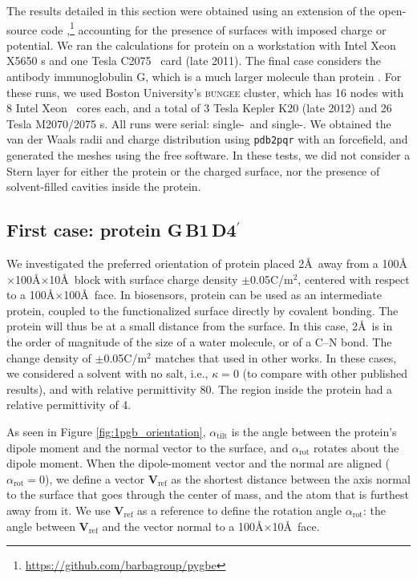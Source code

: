 
The results detailed in this section were obtained using an extension of the open-source code \pygbe,\footnote{\href{https://github.com/barbagroup/pygbe}{https://github.com/barbagroup/pygbe}} accounting for the presence of surfaces with imposed charge or potential.\cite{CooperBarba2015a}
We ran the calculations for protein \gb on a workstation with Intel Xeon X5650 \cpu s  and one \nvidia Tesla C2075 \gpu\ card (late 2011). 
The final case considers the antibody immunoglobulin G, which is a much larger molecule than protein \gb. For these runs, we used Boston University's \textsc{bungee} cluster, which has 16 nodes with 8 Intel Xeon \cpu\ cores each, and a total of 3 \nvidia Tesla Kepler K20 (late 2012) and 26 \nvidia Tesla M2070/2075 \gpu s. All runs were serial: single-\cpu\ and single-\gpu. 
We obtained the van der Waals radii and charge distribution using \texttt{pdb2pqr}\cite{Dolinsky04} with an \amber forcefield, and generated the meshes using the free \msms software.\cite{SannerOlsonSpehner1995}
In these tests, we did not consider a Stern layer for either the protein or the charged surface, nor the presence of solvent-filled cavities inside the protein.

\subsection{First case: protein G\,B1\,D4$^{\prime}$} \label{sec:PGB}

We investigated the preferred orientation of protein \gb placed 2\AA\ away from a 100\AA$\times$100\AA$\times$10\AA\ block with surface charge density $\pm$0.05C/m$^2$, centered with respect to a 100\AA$\times$100\AA\ face.
In biosensors, protein \gb can be used as an intermediate protein, coupled to the functionalized surface directly by covalent bonding.
The protein will thus be at a small distance from the surface. In this case, 2\AA\ is in the order of magnitude of the size of a water molecule, or of a C--N bond.
The change density of $\pm$0.05C/m$^2$ matches that used in other works.\cite{LiuLiaoZhou2013}
In these cases, we considered a solvent with no salt, i.e., $\kappa=0$ (to compare with other published results), and with relative permittivity 80. The region inside the protein had a relative permittivity of 4.

As seen in Figure \ref{fig:1pgb_orientation}, $\alpha_\text{tilt}$ is the angle between the protein's dipole moment and the normal vector to the surface, and $\alpha_\text{rot}$ rotates about the dipole moment. 
When the dipole-moment vector and the normal are aligned ($\alpha_\text{rot}=0$), we define a vector $\mathbf{V}_\text{ref}$ as the shortest distance between the axis normal to the surface that goes through the center of mass, and the atom that is furthest away from it. 
We use $\mathbf{V}_\text{ref}$ as a reference to define the rotation angle $\alpha_\text{rot}$: the angle between $\mathbf{V}_\text{ref}$ and the vector normal to a 100\AA$\times$10\AA\ face.  


